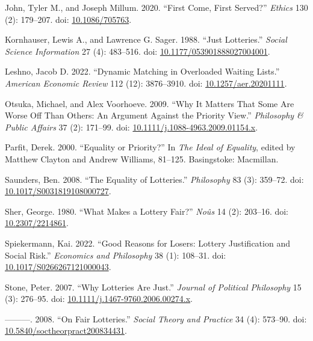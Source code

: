 \documentclass[
  11pt,
  letterpaper,
  DIV=11,
  numbers=noendperiod,
  twoside]{scrartcl}
\newlength{\cslhangindent}
\newenvironment{CSLReferences}[2] %
 {\begin{list}{}{%
  \setlength{\itemindent}{0pt}
  \setlength{\leftmargin}{0pt}
  \setlength{\parsep}{0pt}
  \ifodd #1
   \setlength{\leftmargin}{\cslhangindent}
   \setlength{\itemindent}{-1\cslhangindent}
  \fi
  \setlength{\itemsep}{#2\baselineskip}}}
 {\end{list}}
\begin{document}
\begin{CSLReferences}{1}{0}
John, Tyler M., and Joseph Millum. 2020. {``First Come, First Served?''}
\emph{Ethics} 130 (2): 179--207. doi:
\href{https://doi.org/10.1086/705763}{10.1086/705763}.

Kornhauser, Lewis A., and Lawrence G. Sager. 1988. {``Just Lotteries.''}
\emph{Social Science Information} 27 (4): 483--516. doi:
\href{https://doi.org/10.1177/053901888027004001}{10.1177/053901888027004001}.

Leshno, Jacob D. 2022. {``Dynamic Matching in Overloaded Waiting
Lists.''} \emph{American Economic Review} 112 (12): 3876--3910. doi:
\href{https://doi.org/10.1257/aer.20201111}{10.1257/aer.20201111}.

Otsuka, Michael, and Alex Voorhoeve. 2009. {``Why It Matters That Some
Are Worse Off Than Others: An Argument Against the Priority View.''}
\emph{Philosophy \& Public Affairs} 37 (2): 171--99. doi:
\href{https://doi.org/10.1111/j.1088-4963.2009.01154.x}{10.1111/j.1088-4963.2009.01154.x}.

Parfit, Derek. 2000. {``Equality or Priority?''} In \emph{The Ideal of
Equality}, edited by Matthew Clayton and Andrew Williams, 81--125.
Basingstoke: Macmillan.

Saunders, Ben. 2008. {``The Equality of Lotteries.''} \emph{Philosophy}
83 (3): 359--72. doi:
\href{https://doi.org/10.1017/S0031819108000727}{10.1017/S0031819108000727}.

Sher, George. 1980. {``What Makes a Lottery Fair?''} \emph{No{û}s} 14
(2): 203--16. doi:
\href{https://doi.org/10.2307/2214861}{10.2307/2214861}.

Spiekermann, Kai. 2022. {``Good Reasons for Losers: Lottery
Justification and Social Risk.''} \emph{Economics and Philosophy} 38
(1): 108--31. doi:
\href{https://doi.org/10.1017/S0266267121000043}{10.1017/S0266267121000043}.

Stone, Peter. 2007. {``Why Lotteries Are Just.''} \emph{Journal of
Political Philosophy} 15 (3): 276--95. doi:
\href{https://doi.org/10.1111/j.1467-9760.2006.00274.x}{10.1111/j.1467-9760.2006.00274.x}.

---------. 2008. {``On Fair Lotteries.''} \emph{Social Theory and
Practice} 34 (4): 573--90. doi:
\href{https://doi.org/10.5840/soctheorpract200834431}{10.5840/soctheorpract200834431}.


\end{CSLReferences}
\end{document}
